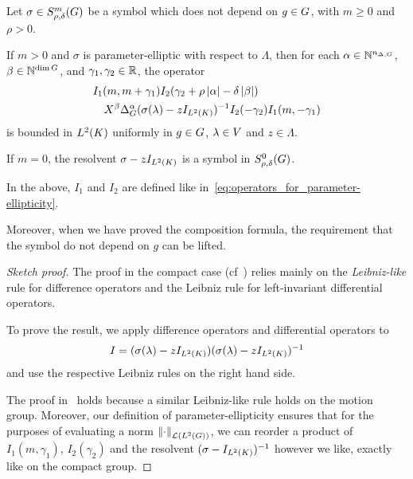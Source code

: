 \begin{lemma}
\label{lemma:fall_in_order_for_parameter-elliptic_symbols}
    Let $\sigma \in \SymbolClass m {\rho, \delta}$ be a symbol which does not depend on $g \in \Group$,
    with $m \geq 0$ and $\rho > 0$.

    If $m > 0$ and $\sigma$ is parameter-elliptic with respect to $\Lambda$, then
    for each $\alpha \in \N^{\dimDifferenceOperators}$, $\beta \in \N^{\dim \Group}$, and $\gamma_1, \gamma_2 \in \R$,
    the operator
    \begin{align*}
        &I_1(m, m + \gamma_1)
        I_2(\gamma_2 + \rho \abs \alpha - \delta \abs \beta)\\
        &\quad
        \LeftDifferentialOperator \beta
        \DifferenceOperatorOrder \alpha (\sigma(\lambda) - z \Id {\Lebesgue 2 \CompactGroup})^{-1}
        I_2(-\gamma_2)
        I_1(m, -\gamma_1)
    \end{align*}
    is bounded in $\Lebesgue 2 \CompactGroup$ uniformly in $g \in \Group$, $\lambda \in \VectorSpace$ and $z \in \Lambda$.

    If $m = 0$,
    the resolvent $\sigma - z \Id {\Lebesgue 2 \CompactGroup}$ is a symbol in $\SymbolClass 0 {\rho, \delta}$.

    In the above, $I_1$ and $I_2$ are defined like in~\eqref{eq:operators_for_parameter-ellipticity}.

    Moreover, when we have proved the composition formula,
    the requirement that the symbol do not depend on $g$ can be lifted.
\end{lemma}
\begin{proof}[Sketch proof]
    The proof in the compact case (cf~\cite[Theorem 3.1. (1)]{RuzhanskyWirth14}) relies mainly on the \emph{Leibniz-like} rule for difference operators
    and the Leibniz rule for left-invariant differential operators.

    To prove the result, we apply difference operators and differential operators to
    \begin{align*}
        I = (\sigma(\lambda) - z \Id {\Lebesgue 2 \CompactGroup}) (\sigma(\lambda) - z \Id {\Lebesgue 2 \CompactGroup})^{-1}
    \end{align*}
    and use the respective Leibniz rules on the right hand side.

    The proof in~\cite{RuzhanskyWirth14} holds because a similar Leibniz-like rule holds on the motion group.
    Moreover, our definition of parameter-ellipticity ensures that for the purposes of evaluating a norm $\norm [\Lin {\Lebesgue 2 \Group}] \dummy$,
    we can reorder a product of $I_1(m, \gamma_1)$, $I_2(\gamma_2)$ and the resolvent $(\sigma - \Id {\Lebesgue 2 \CompactGroup})^{-1}$ however we like,
    exactly like on the compact group.
\end{proof}


